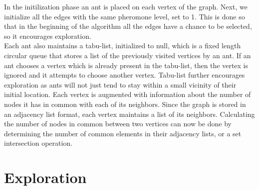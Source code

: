\begin{spacing}{1.5}
In the initilization phase an ant is placed on each vertex of the graph. Next, we initialize all the edges with the same pheromone level, set to 1. This is done so that in the beginning of the algorithm all the edges have a chance to be selected, so it encourages exploration.\\
\indent Each ant also maintains a tabu-list, initialized to null, which is a fixed length circular queue that stores a list of the previously visited vertices by an ant. If an ant chooses a vertex which is already present in the tabu-list, then the vertex is ignored and it attempts to choose another vertex. Tabu-list further encourages exploration as ants will not just tend to stay within a small vicinity of their initial location.
\indent Each vertex is augmented with information about the number of nodes it has in common with each of its neighbors. Since the graph is stored in an adjacency list format, each vertex maintains a list of its neighbors. Calculating the number of nodes in common between two vertices can now be done by determining the number of common elements in their adjacency lists, or a set intersection operation. 

\section{Exploration}


\end{spacing}
